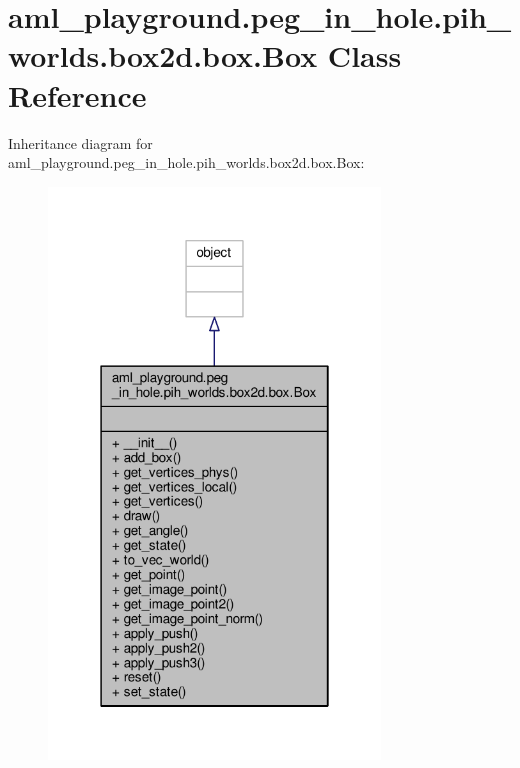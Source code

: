 \hypertarget{classaml__playground_1_1peg__in__hole_1_1pih__worlds_1_1box2d_1_1box_1_1_box}{\section{aml\-\_\-playground.\-peg\-\_\-in\-\_\-hole.\-pih\-\_\-worlds.\-box2d.\-box.\-Box Class Reference}
\label{classaml__playground_1_1peg__in__hole_1_1pih__worlds_1_1box2d_1_1box_1_1_box}
}


Inheritance diagram for aml\-\_\-playground.\-peg\-\_\-in\-\_\-hole.\-pih\-\_\-worlds.\-box2d.\-box.\-Box\-:
\nopagebreak
\begin{figure}[H]
\begin{center}
\leavevmode
\includegraphics[width=250pt]{classaml__playground_1_1peg__in__hole_1_1pih__worlds_1_1box2d_1_1box_1_1_box__inherit__graph}
\end{center}
\end{figure}



